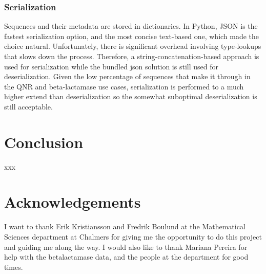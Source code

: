 \documentclass[a4paper,12pt]{article}
\begin{document}
\subsubsection{Serialization}
Sequences and their metadata are stored in dictionaries. In Python, JSON is the fastest serialization option, and the most concise text-based one, which made the choice natural. Unfortunately, there is significant overhead involving type-lookups that slows down the process. Therefore, a string-concatenation-based approach is used for serialization while the bundled json solution is still used for deserialization. Given the low percentage of sequences that make it through in the QNR and beta-lactamase use cases, serialization is performed to a much higher extend than deserialization so the somewhat suboptimal deserialization is still acceptable.

\section{Conclusion}
xxx

\section{Acknowledgements}
I want to thank Erik Kristiansson and Fredrik Boulund at the Mathematical Sciences department at Chalmers for giving me the opportunity to do this project and guiding me along the way. I would also like to thank Mariana Pereira for help with the betalactamase data, and the people at the department for good times.

\printbibliography
\end{document}
